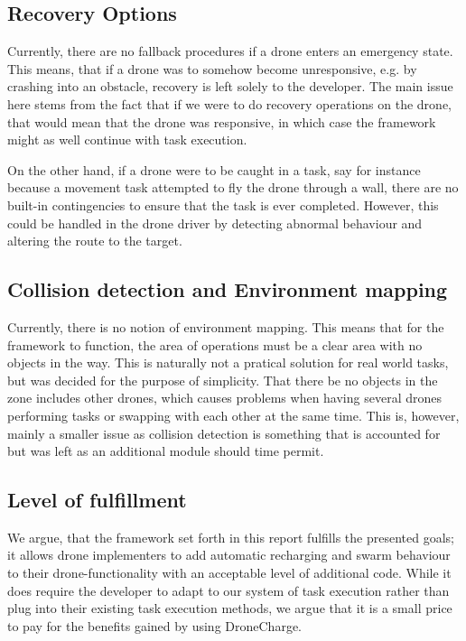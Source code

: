 \subsection{Recovery Options}
Currently, there are no fallback procedures if a drone enters an emergency state. This means, that if a drone was to somehow become unresponsive, e.g. by crashing into an obstacle, recovery is left solely to the developer. The main issue here stems from the fact that if we were to do recovery operations on the drone, that would mean that the drone was responsive, in which case the framework might as well continue with task execution.

On the other hand, if a drone were to be caught in a task, say for instance because a movement task attempted to fly the drone through a wall, there are no built-in contingencies to ensure that the task is ever completed. However, this could be handled in the drone driver by detecting abnormal behaviour and altering the route to the target.

\subsection{Collision detection and Environment mapping}
Currently, there is no notion of environment mapping. This means that for the framework to function, the area of operations must be a clear area with no  objects in the way. This is naturally not a pratical solution for real world tasks, but was decided for the purpose of simplicity. That there be no objects in the zone includes other drones, which causes problems when having several drones performing tasks or swapping with each other at the same time. This is, however, mainly a smaller issue as collision detection is something that is accounted for but was left as an additional module should time permit.

\subsection{Level of fulfillment}
We argue, that the framework set forth in this report fulfills the presented goals; it allows drone implementers to add automatic recharging and swarm behaviour to their drone-functionality with an acceptable level of additional code. While it does require the developer to adapt to our system of task execution rather than plug into their existing task execution methods, we argue that it is a small price to pay for the benefits gained by using DroneCharge.